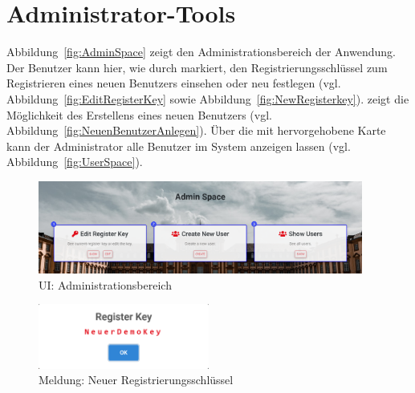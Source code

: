 \section{Administrator-Tools}
\label{ssec:AdministratorTools}

Abbildung~\vref{fig:AdminSpace} zeigt den Administrationsbereich der Anwendung.
Der Benutzer kann hier, wie durch \desOne markiert, den Registrierungsschlüssel zum Registrieren eines neuen Benutzers einsehen oder neu festlegen (vgl. Abbildung~\vref{fig:EditRegisterKey} sowie Abbildung~\vref{fig:NewRegisterkey}). \newline
\desTwo zeigt die Möglichkeit des Erstellens eines neuen Benutzers (vgl. Abbildung~\vref{fig:NeuenBenutzerAnlegen}).
Über die mit \desThree hervorgehobene Karte kann der Administrator alle Benutzer im System anzeigen lassen (vgl. Abbildung~\vref{fig:UserSpace}).

\begin{figure}[H]
	\centering
	\includegraphics[width=0.95\textwidth, keepaspectratio]{img/guide/AdminSpace.png}
	\captionsetup{justification=centering, format=plain}
	\caption[\acl{UI}: Administrationsbereich]{\acl{UI}: Administrationsbereich \\\quelleScreenshot}
	\label{fig:AdminSpace}
\end{figure}

\begin{figure}[H]
	\centering

	\includegraphics[width=0.5\textwidth, keepaspectratio, trim=2mm 0 2mm 0, clip]{img/guide/RegisterKey.png}
	\captionsetup{justification=centering, format=plain}
	\caption[Meldung: Neuer Registrierungsschlüssel]{Meldung: Neuer Registrierungsschlüssel \\\quelleScreenshot}
	\label{fig:NewRegisterkey}
\end{figure}

